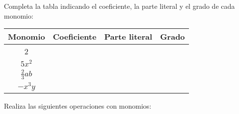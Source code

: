 \documentclass[spanish, 11pt]{exam}
\begin{document}
\begin{questions}
% 

\question[1]
Completa la tabla indicando el coeficiente, la parte literal y el grado de cada monomio:


\begin{tabular}{|c|c|c|c|}
\hline
\textbf{Monomio} & \textbf{Coeficiente} & \textbf{Parte literal} & \textbf{Grado} \\
\hline
2 & & & \\
\hline
$5x^2$ & & & \\
\hline
$\frac{2}{3}ab$ & & & \\
\hline
$-x^3y$ & & & \\
\hline
\end{tabular}



\question[1]
Realiza las siguientes operaciones con monomios:
\begin{multicols}{2}
\end{multicols}

% 



\end{questions}
\end{document}
